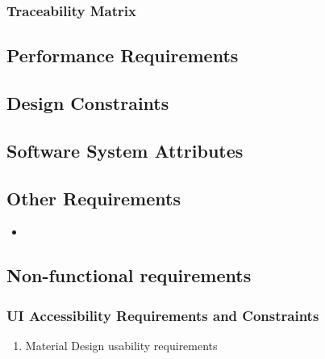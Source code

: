 \documentclass[12pt]{article}
\begin{document}
{{		\subsubsection{Traceability Matrix}


        \subsection{Performance Requirements}


        \subsection{Design Constraints}


        \subsection{Software System Attributes}


        \subsection{Other Requirements}
			\begin{itemize}
  				\item
			\end{itemize}
	\subsection{Non-functional requirements}
    \subsubsection{UI Accessibility Requirements and Constraints}
     \begin{enumerate}
   \item Material Design usability requirements


\end{enumerate}}}
\end{document}
